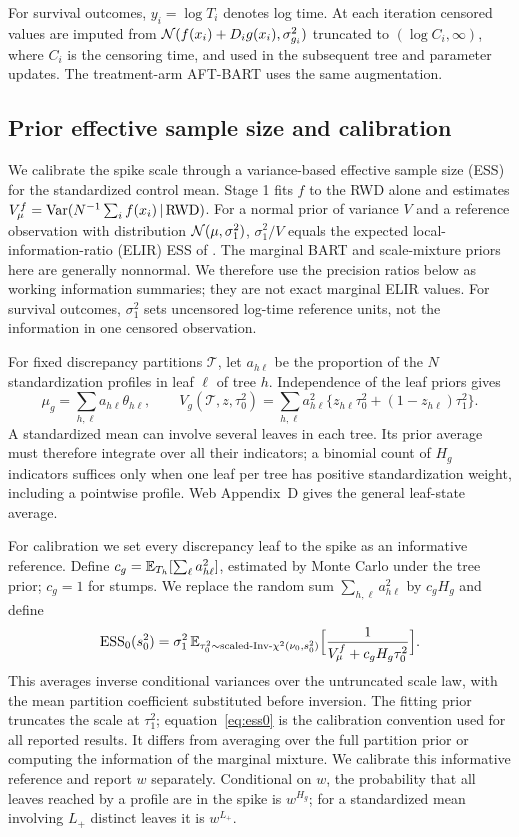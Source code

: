 For survival outcomes, $y_i=\log T_i$ denotes log time. At each iteration censored values are imputed from $\mathcal{N}(f(x_i)+D_ig(x_i),\sigma_{g_i}^2)$ truncated to $(\log C_i,\infty)$, where $C_i$ is the censoring time, and used in the subsequent tree and parameter updates. The treatment-arm AFT-BART uses the same augmentation.

\subsection{Prior effective sample size and calibration}
\label{sec:ess}

We calibrate the spike scale through a variance-based effective sample size (ESS) for the standardized control mean. Stage 1 fits $f$ to the RWD alone and estimates $V_\mu^f=\mathrm{Var}(N^{-1}\sum_i f(x_i)\,\vert\,\text{RWD})$. For a normal prior of variance $V$ and a reference observation with distribution $\mathcal{N}(\mu,\sigma_1^2)$, $\sigma_1^2/V$ equals the expected local-information-ratio (ELIR) ESS of \citet{neuenschwander2020}. The marginal BART and scale-mixture priors here are generally nonnormal. We therefore use the precision ratios below as working information summaries; they are not exact marginal ELIR values. For survival outcomes, $\sigma_1^2$ sets uncensored log-time reference units, not the information in one censored observation.

For fixed discrepancy partitions $\mathcal T$, let $a_{h\ell}$ be the proportion of the $N$ standardization profiles in leaf $\ell$ of tree $h$. Independence of the leaf priors gives
\[
\mu_g=\sum_{h,\ell}a_{h\ell}\theta_{h\ell},\qquad
V_g(\mathcal T,z,\tau_0^2)=\sum_{h,\ell}a_{h\ell}^2
 \{z_{h\ell}\tau_0^2+(1-z_{h\ell})\tau_1^2\}.
\]
A standardized mean can involve several leaves in each tree. Its prior average must therefore integrate over all their indicators; a binomial count of $H_g$ indicators suffices only when one leaf per tree has positive standardization weight, including a pointwise profile. Web Appendix~D gives the general leaf-state average.

For calibration we set every discrepancy leaf to the spike as an informative reference. Define $c_g=\mathbb{E}_{T_h}[\sum_\ell a_{h\ell}^2]$, estimated by Monte Carlo under the tree prior; $c_g=1$ for stumps. We replace the random sum $\sum_{h,\ell}a_{h\ell}^2$ by $c_gH_g$ and define
\begin{equation}
\mathrm{ESS}_0(s_0^2)=\sigma_1^2\,\mathbb{E}_{\tau_0^2\sim\text{scaled-Inv-}\chi^2(\nu_0,s_0^2)}\Bigl[\frac1{V_\mu^f+c_gH_g\tau_0^2}\Bigr].
\label{eq:ess0}
\end{equation}
This averages inverse conditional variances over the untruncated scale law, with the mean partition coefficient substituted before inversion. The fitting prior truncates the scale at $\tau_1^2$; equation~\eqref{eq:ess0} is the calibration convention used for all reported results. It differs from averaging over the full partition prior or computing the information of the marginal mixture. We calibrate this informative reference and report $w$ separately. Conditional on $w$, the probability that all leaves reached by a profile are in the spike is $w^{H_g}$; for a standardized mean involving $L_+$ distinct leaves it is $w^{L_+}$.

